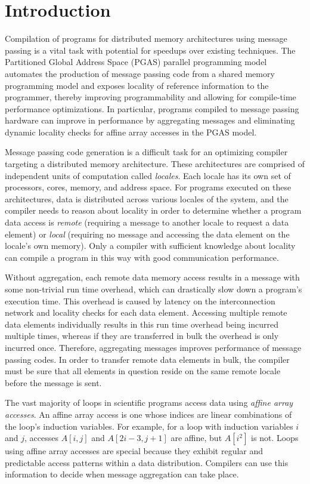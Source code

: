 \section{Introduction}\label{sec:intro} 

Compilation of programs for distributed memory architectures using message passing is a vital task with potential for speedups over existing techniques. The Partitioned Global Address Space (PGAS) parallel programming model automates the production of message passing code from a shared memory programming model and exposes locality of reference information to the programmer, thereby improving programmability and allowing for compile-time performance optimizations. In particular, programs compiled to message passing hardware can improve in performance by aggregating messages and eliminating dynamic locality checks for affine array accesses in the PGAS model. 

Message passing code generation is a difficult task for an optimizing compiler targeting a distributed memory architecture. These architectures are comprised of independent units of computation called \textit{locales}. Each locale has its own set of processors, cores, memory, and address space. For programs executed on these architectures, data is distributed across various locales of the system, and the compiler needs to reason about locality in order to determine whether a program data access is \textit{remote} (requiring a message to another locale to request a data element) or \textit{local} (requiring no message and accessing the data element on the locale's own memory). Only a compiler with sufficient knowledge about locality can compile a program in this way with good communication performance. 

Without aggregation, each remote data memory access results in a message with some non-trivial run time overhead, which can drastically slow down a program's execution time. This overhead is caused by latency on the interconnection network and locality checks for each data element. Accessing multiple remote data elements individually results in this run time overhead being incurred multiple times, whereas if they are transferred in bulk the overhead is only incurred once. Therefore, aggregating messages improves performance of message passing codes. In order to transfer remote data elements in bulk, the compiler must be sure that all elements in question reside on the same remote locale before the message is sent. 

The vast majority of loops in scientific programs access data using \textit{affine array accesses}. An affine array access is one whose indices are linear combinations of the loop's induction variables. For example, for a loop with induction variables $i$ and $j$, accesses $A[i, j]$ and $A[2i-3, j+1]$ are affine, but $A[i^2]$ is not. Loops using affine array accesses are special because they exhibit regular and predictable access patterns within a data distribution. Compilers can use this information to decide when message aggregation can take place. 

